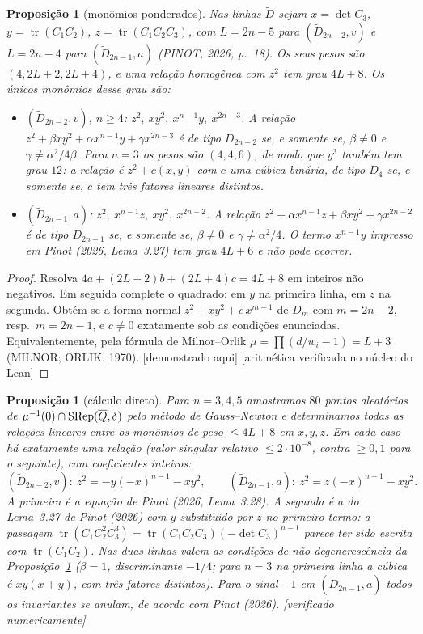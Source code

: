 \documentclass[11pt]{article}
\newtheorem{proposition}[theorem]{Proposição}
\theoremstyle{definition}
\theoremstyle{remark}
\newcommand{\tagP}{\textsf{\small[demonstrado aqui]}}
\newcommand{\tagN}{\textsf{\small[verificado numericamente]}}
\newcommand{\tagK}{\textsf{\small[aritmética verificada no núcleo do Lean]}}
\begin{document}
\begin{proposition}[monômios ponderados]\label{prop:enum}
Nas linhas $\widetilde D$ sejam $x=\det C_3$, $y=\operatorname{tr}(C_1C_2)$, $z=\operatorname{tr}(C_1C_2C_3)$, com $L=2n-5$ para $(\widetilde D_{2n-2},v)$ e $L=2n-4$ para $(\widetilde D_{2n-1},a)$ (PINOT, 2026, p.~18). Os seus pesos são $(4,2L+2,2L+4)$, e uma relação homogênea com $z^2$ tem grau $4L+8$. Os únicos monômios desse grau são:
\begin{itemize}[leftmargin=*]
\item $(\widetilde D_{2n-2},v)$, $n\ge4$: $z^2,\ xy^2,\ x^{n-1}y,\ x^{2n-3}$. A relação $z^2+\beta xy^2+\alpha x^{n-1}y+\gamma x^{2n-3}$ é de tipo $D_{2n-2}$ se, e somente se, $\beta\ne0$ e $\gamma\neq\alpha^2/4\beta$. Para $n=3$ os pesos são $(4,4,6)$, de modo que $y^3$ também tem grau $12$: a relação é $z^2+c(x,y)$ com $c$ uma cúbica binária, de tipo $D_4$ se, e somente se, $c$ tem três fatores lineares distintos.
\item $(\widetilde D_{2n-1},a)$: $z^2,\ x^{n-1}z,\ xy^2,\ x^{2n-2}$. A relação $z^2+\alpha x^{n-1}z+\beta xy^2+\gamma x^{2n-2}$ é de tipo $D_{2n-1}$ se, e somente se, $\beta\ne0$ e $\gamma\ne\alpha^2/4$. O termo $x^{n-1}y$ impresso em Pinot (2026, Lema~3.27) tem grau $4L+6$ e não pode ocorrer.
\end{itemize}
\end{proposition}
\begin{proof}
Resolva $4a+(2L+2)b+(2L+4)c=4L+8$ em inteiros não negativos. Em seguida complete o quadrado: em $y$ na primeira linha, em $z$ na segunda. Obtém-se a forma normal $z^2+xy^2+c\,x^{m-1}$ de $D_m$ com $m=2n-2$, resp.\ $m=2n-1$, e $c\neq0$ exatamente sob as condições enunciadas. Equivalentemente, pela fórmula de Milnor--Orlik $\mu=\prod(d/w_i-1)=L+3$ (MILNOR; ORLIK, 1970). \tagP{} \tagK
\end{proof}

\begin{proposition}[cálculo direto]\label{prop:numeric}
Para $n=3,4,5$ amostramos $80$ pontos aleatórios de $\mu^{-1}(0)\cap\mathrm{SRep}(\overline Q,\delta)$ pelo método de Gauss--Newton e determinamos todas as relações lineares entre os monômios de peso $\le 4L+8$ em $x,y,z$. Em cada caso há exatamente uma relação (valor singular relativo $\le2\cdot10^{-8}$, contra $\ge0{,}1$ para o seguinte), com coeficientes inteiros:
\[
(\widetilde D_{2n-2},v):\ z^2=-y(-x)^{n-1}-xy^2,\qquad (\widetilde D_{2n-1},a):\ z^2=z(-x)^{n-1}-xy^2 .
\]
A primeira é a equação de Pinot (2026, Lema~3.28). A segunda é a do Lema~3.27 de Pinot (2026) com $y$ substituído por $z$ no primeiro termo: a passagem $\operatorname{tr}(C_1C_2^2C_3^3)=\operatorname{tr}(C_1C_2C_3)(-\det C_3)^{n-1}$ parece ter sido escrita com $\operatorname{tr}(C_1C_2)$. Nas duas linhas valem as condições de não degenerescência da Proposição~\ref{prop:enum} ($\beta=1$, discriminante $-1/4$; para $n=3$ na primeira linha a cúbica é $xy(x+y)$, com três fatores distintos). Para o sinal $-1$ em $(\widetilde D_{2n-1},a)$ todos os invariantes se anulam, de acordo com Pinot (2026). \tagN
\end{proposition}
\end{document}
